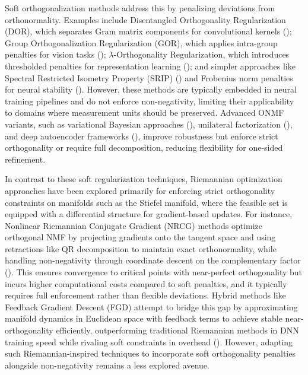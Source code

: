 \documentclass[
]{article}
\begin{document}
Soft orthogonalization methods address this by penalizing deviations from orthonormality. Examples include Disentangled Orthogonality Regularization (DOR), which separates Gram matrix components for convolutional kernels (); Group Orthogonalization Regularization (GOR), which applies intra-group penalties for vision tasks (); \(\lambda\)-Orthogonality Regularization, which introduces thresholded penalties for representation learning (); and simpler approaches like Spectral Restricted Isometry Property (SRIP) () and Frobenius norm penalties for neural stability (). However, these methods are typically embedded in neural training pipelines and do not enforce non-negativity, limiting their applicability to domains where measurement units should be preserved. Advanced ONMF variants, such as variational Bayesian approaches (), unilateral factorization (), and deep autoencoder frameworks (), improve robustness but enforce strict orthogonality or require full decomposition, reducing flexibility for one-sided refinement.

In contrast to these soft regularization techniques, Riemannian optimization approaches have been explored primarily for enforcing strict orthogonality constraints on manifolds such as the Stiefel manifold, where the feasible set is equipped with a differential structure for gradient-based updates. For instance, Nonlinear Riemannian Conjugate Gradient (NRCG) methods optimize orthogonal NMF by projecting gradients onto the tangent space and using retractions like QR decomposition to maintain exact orthonormality, while handling non-negativity through coordinate descent on the complementary factor (). This ensures convergence to critical points with near-perfect orthogonality but incurs higher computational costs compared to soft penalties, and it typically requires full enforcement rather than flexible deviations. Hybrid methods like Feedback Gradient Descent (FGD) attempt to bridge this gap by approximating manifold dynamics in Euclidean space with feedback terms to achieve stable near-orthogonality efficiently, outperforming traditional Riemannian methods in DNN training speed while rivaling soft constraints in overhead (). However, adapting such Riemannian-inspired techniques to incorporate soft orthogonality penalties alongside non-negativity remains a less explored avenue.
\end{document}
